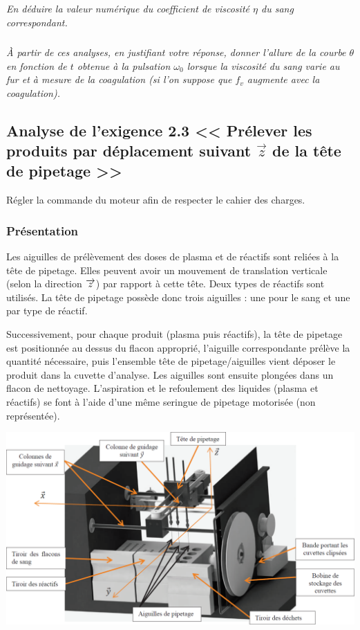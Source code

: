 \documentclass[10pt,fleqn]{article} %
\begin{document}
\begin{multicols}{2}
\begin{minipage}[c]{.48\linewidth}
\end{minipage} 


\subparagraph{}\textit{En déduire la valeur numérique du coefficient de viscosité  $\eta$ du sang correspondant.}

\subparagraph{}\textit{À partir de ces analyses, en justifiant votre réponse, donner l’allure de la courbe $\theta$ en fonction de $t$ obtenue à la pulsation $\omega_0$ lorsque la viscosité du sang varie au fur et à mesure de la coagulation (si l’on suppose que $f_v$ augmente avec la coagulation).}

\subsection*{Analyse de l’exigence 2.3 << Prélever les produits par déplacement suivant  $\vec{z}$ de la tête de pipetage >>}%
\begin{obj}
Régler la commande du moteur afin de respecter le cahier des charges.
\end{obj}

\subsubsection*{Présentation}
Les aiguilles de prélèvement des doses de plasma et de réactifs sont reliées à la tête de pipetage.
Elles peuvent avoir un mouvement de translation verticale (selon la direction $\overrightarrow{z}$) par rapport à cette
tête. Deux types de réactifs sont utilisés. La tête de pipetage possède donc trois aiguilles : une pour
le sang et une par type de réactif.

Successivement, pour chaque produit (plasma puis réactifs), la tête de pipetage est positionnée au dessus
du flacon approprié, l’aiguille correspondante prélève la quantité nécessaire, puis l’ensemble
tête de pipetage/aiguilles vient déposer le produit dans la cuvette d’analyse. Les aiguilles sont
ensuite plongées dans un flacon de nettoyage. L’aspiration et le refoulement des liquides (plasma et
réactifs) se font à l’aide d’une même seringue de pipetage motorisée (non représentée).

\begin{center}
\includegraphics[width=\linewidth]{images/ccp_13}
\end{center}


\end{multicols}
\end{document}
